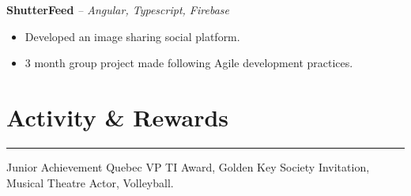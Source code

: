 \documentclass[11pt]{article}
\let\origsection\section
\renewcommand{\section}[2]{
    \origsection*{\LARGE \color{#2}#1} \hrule
}
\renewcommand{\subsection}[4]{
    \textcolor{#4}{\large \textbf{#1} \textit{-- #2} \hfill {#3}}
}
\begin{document}

\subsection{ShutterFeed}{Angular, Typescript, Firebase}{}{blacker}
\begin{itemize}[noitemsep]
    \item Developed  an image sharing social platform.
    \item 3 month group project made following Agile development practices.
\end{itemize}

\section{Activity \& Rewards}{blacker}
Junior Achievement Quebec VP TI Award, Golden Key Society Invitation, Musical Theatre Actor, Volleyball.
\end{document}
